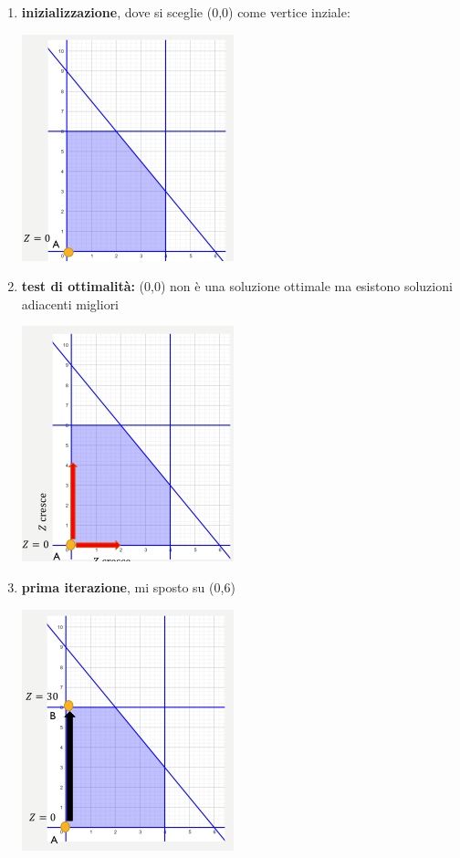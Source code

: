 \message{ !name(ro.tex)}\documentclass[a4paper,12pt, oneside]{book}
\begin{document}
\begin{enumerate}
  \item \textbf{inizializzazione}, dove si sceglie (0,0) come vertice
  inziale:
  \begin{center}
    \includegraphics[scale = 0.8]{img/simp8.png}
  \end{center}
  \item \textbf{test di ottimalità:} (0,0) non è una soluzione
  ottimale ma esistono soluzioni adiacenti migliori
  \begin{center}
    \includegraphics[scale = 0.8]{img/simp9.png}
  \end{center}
  \item \textbf{prima iterazione}, mi sposto su (0,6)
  \begin{center}
    \includegraphics[scale = 0.8]{img/simp10.png}

\end{center}
\end{enumerate}
\end{document}
